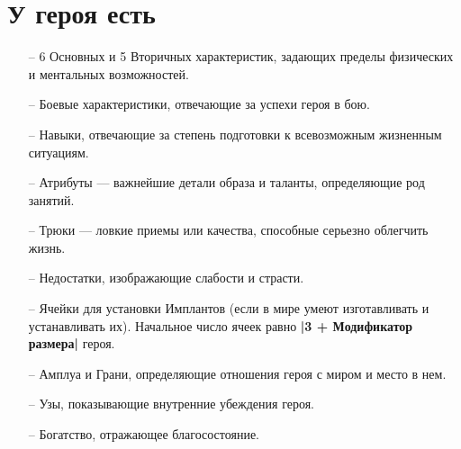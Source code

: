 \section{У героя есть}
\begin{itemize}
\item[--] 6 Основных и 5 Вторичных характеристик, задающих пределы физических и ментальных возможностей.
\item[--] Боевые характеристики, отвечающие за успехи героя в бою.
\item[--] Навыки, отвечающие за степень подготовки к всевозможным жизненным ситуациям.
\item[--] Атрибуты — важнейшие детали образа и таланты, определяющие род занятий.
\item[--] Трюки — ловкие приемы или качества, способные серьезно облегчить жизнь.
\item[--] Недостатки, изображающие слабости и страсти.
\item[--] Ячейки для установки Имплантов (если в мире умеют изготавливать и устанавливать их). Начальное число ячеек равно \textbf{|3 + Модификатор размера|} героя.
\item[--] Амплуа и Грани, определяющие отношения героя с миром и место в нем.
\item[--] Узы, показывающие внутренние убеждения героя.
\item[--] Богатство, отражающее благосостояние.
\end{itemize}
